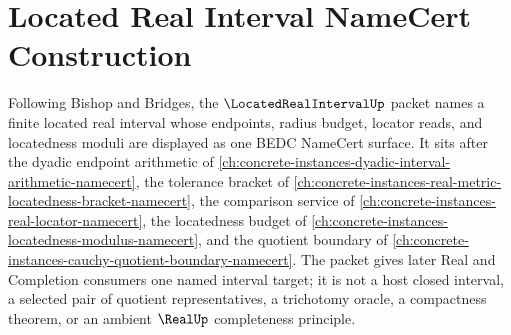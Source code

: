 \chapter{Located Real Interval NameCert Construction}
\label{ch:concrete-instances-located-real-interval-namecert}

Following Bishop and Bridges, the $\LocatedRealIntervalUp$ packet names a finite located real interval whose endpoints, radius budget, locator reads, and locatedness moduli are displayed as one BEDC NameCert surface. It sits after the dyadic endpoint arithmetic of \autoref{ch:concrete-instances-dyadic-interval-arithmetic-namecert}, the tolerance bracket of \autoref{ch:concrete-instances-real-metric-locatedness-bracket-namecert}, the comparison service of \autoref{ch:concrete-instances-real-locator-namecert}, the locatedness budget of \autoref{ch:concrete-instances-locatedness-modulus-namecert}, and the quotient boundary of \autoref{ch:concrete-instances-cauchy-quotient-boundary-namecert}. The packet gives later Real and Completion consumers one named interval target; it is not a host closed interval, a selected pair of quotient representatives, a trichotomy oracle, a compactness theorem, or an ambient $\RealUp$ completeness principle.

